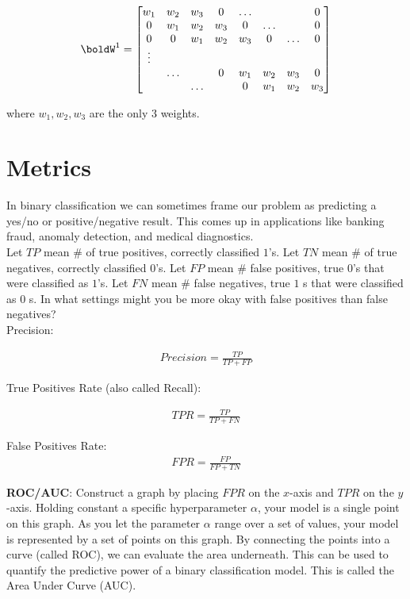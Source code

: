 \documentclass[12pt,letterpaper]{article}
\newcommand{\1}{\mathbbm{1}}
\begin{document}
  \[ \boldW^1 =
  \begin{bmatrix}
    w_1 & w_2 &  w_3 & 0 &\ldots & & & 0\\
    0 & w_1 & w_2 & w_3 & 0  & \ldots& &  0\\
    0 & 0 & w_1 & w_2 & w_3 & 0 & \ldots & 0\\
    \vdots \\ 
    &\ldots && 0 & w_1 & w_2 & w_3 & 0 \\
    && \ldots&  & 0 & w_1 & w_2 & w_3 \\
  \end{bmatrix}
\] 

where $w_1, w_2, w_3$ are the only 3 weights.

\section{Metrics}

In binary classification we can sometimes frame our problem as predicting a yes/no or positive/negative result. This comes up in applications like banking fraud, anomaly detection, and medical diagnostics.\\

\noindent 
Let $TP$ mean \# of true positives, correctly classified $1$'s. Let $TN$ mean \# of true negatives, correctly classified $0$'s. Let $FP$ mean \# false positives, true $0$'s that were classified as $1$'s. Let $FN$ mean \# false negatives, true $1$
s that were classified as $0$
s. In what settings might you be more okay with false positives than false negatives?\\

\noindent 
Precision:

\begin{align}
 Precision = \frac{TP}{TP + FP}
\end{align}

\noindent 
True Positives Rate (also called Recall):

\begin{align}
TPR = \frac{TP}{TP+FN}
\end{align}

\noindent 
False Positives Rate:
\begin{align}
FPR = \frac{FP}{FP + TN}
\end{align}


\noindent 
\textbf{ROC/AUC}: Construct a graph by placing $FPR$ on the $x$-axis and $TPR$ on the $y$-axis.
Holding constant a specific hyperparameter $\alpha$, your model is a single point on this graph. As you let the parameter $\alpha$ range over a set of values, your model is represented by a set of points on this graph. By connecting the points into a curve (called ROC), we can evaluate the area underneath. This can be used to quantify the predictive power of a binary classification model. This is called the Area Under Curve (AUC).
\end{document}
